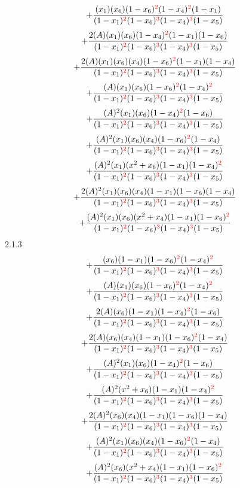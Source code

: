 \documentclass{article}
\begin{document}
\[+\frac{(x_1)(x_6)(1-x_6)^{\textcolor{red}{2}}(1-x_4)^{\textcolor{red}{2}}(1-x_1)}{(1-x_1)^{\textcolor{red}{2}}(1-x_6)^{\textcolor{red}{3}}(1-x_4)^{\textcolor{red}{3}}(1-x_5)}\]\[+\frac{2(A)(x_1)(x_6)(1-x_4)^{\textcolor{red}{2}}(1-x_1)(1-x_6)}{(1-x_1)^{\textcolor{red}{2}}(1-x_6)^{\textcolor{red}{3}}(1-x_4)^{\textcolor{red}{3}}(1-x_5)}\]\[+\frac{2(A)(x_1)(x_6)(x_4)(1-x_6)^{\textcolor{red}{2}}(1-x_1)(1-x_4)}{(1-x_1)^{\textcolor{red}{2}}(1-x_6)^{\textcolor{red}{3}}(1-x_4)^{\textcolor{red}{3}}(1-x_5)}\]\[+\frac{(A)(x_1)(x_6)(1-x_6)^{\textcolor{red}{2}}(1-x_4)^{\textcolor{red}{2}}}{(1-x_1)^{\textcolor{red}{2}}(1-x_6)^{\textcolor{red}{3}}(1-x_4)^{\textcolor{red}{3}}(1-x_5)}\]\[+\frac{(A)^{2}(x_1)(x_6)(1-x_4)^{\textcolor{red}{2}}(1-x_6)}{(1-x_1)^{\textcolor{red}{2}}(1-x_6)^{\textcolor{red}{3}}(1-x_4)^{\textcolor{red}{3}}(1-x_5)}\]\[+\frac{(A)^{2}(x_1)(x_6)(x_4)(1-x_6)^{\textcolor{red}{2}}(1-x_4)}{(1-x_1)^{\textcolor{red}{2}}(1-x_6)^{\textcolor{red}{3}}(1-x_4)^{\textcolor{red}{3}}(1-x_5)}\]\[+\frac{(A)^{2}(x_1)(x^{2}+x_6)(1-x_1)(1-x_4)^{\textcolor{red}{2}}}{(1-x_1)^{\textcolor{red}{2}}(1-x_6)^{\textcolor{red}{3}}(1-x_4)^{\textcolor{red}{3}}(1-x_5)}\]\[+\frac{2(A)^{2}(x_1)(x_6)(x_4)(1-x_1)(1-x_6)(1-x_4)}{(1-x_1)^{\textcolor{red}{2}}(1-x_6)^{\textcolor{red}{3}}(1-x_4)^{\textcolor{red}{3}}(1-x_5)}\]\[+\frac{(A)^{2}(x_1)(x_6)(x^{2}+x_4)(1-x_1)(1-x_6)^{\textcolor{red}{2}}}{(1-x_1)^{\textcolor{red}{2}}(1-x_6)^{\textcolor{red}{3}}(1-x_4)^{\textcolor{red}{3}}(1-x_5)}\]
2.1.3
\[+\frac{(x_6)(1-x_1)(1-x_6)^{\textcolor{red}{2}}(1-x_4)^{\textcolor{red}{2}}}{(1-x_1)^{\textcolor{red}{2}}(1-x_6)^{\textcolor{red}{3}}(1-x_4)^{\textcolor{red}{3}}(1-x_5)}\]\[+\frac{(A)(x_1)(x_6)(1-x_6)^{\textcolor{red}{2}}(1-x_4)^{\textcolor{red}{2}}}{(1-x_1)^{\textcolor{red}{2}}(1-x_6)^{\textcolor{red}{3}}(1-x_4)^{\textcolor{red}{3}}(1-x_5)}\]\[+\frac{2(A)(x_6)(1-x_1)(1-x_4)^{\textcolor{red}{2}}(1-x_6)}{(1-x_1)^{\textcolor{red}{2}}(1-x_6)^{\textcolor{red}{3}}(1-x_4)^{\textcolor{red}{3}}(1-x_5)}\]\[+\frac{2(A)(x_6)(x_4)(1-x_1)(1-x_6)^{\textcolor{red}{2}}(1-x_4)}{(1-x_1)^{\textcolor{red}{2}}(1-x_6)^{\textcolor{red}{3}}(1-x_4)^{\textcolor{red}{3}}(1-x_5)}\]\[+\frac{(A)^{2}(x_1)(x_6)(1-x_4)^{\textcolor{red}{2}}(1-x_6)}{(1-x_1)^{\textcolor{red}{2}}(1-x_6)^{\textcolor{red}{3}}(1-x_4)^{\textcolor{red}{3}}(1-x_5)}\]\[+\frac{(A)^{2}(x^{2}+x_6)(1-x_1)(1-x_4)^{\textcolor{red}{2}}}{(1-x_1)^{\textcolor{red}{2}}(1-x_6)^{\textcolor{red}{3}}(1-x_4)^{\textcolor{red}{3}}(1-x_5)}\]\[+\frac{2(A)^{2}(x_6)(x_4)(1-x_1)(1-x_6)(1-x_4)}{(1-x_1)^{\textcolor{red}{2}}(1-x_6)^{\textcolor{red}{3}}(1-x_4)^{\textcolor{red}{3}}(1-x_5)}\]\[+\frac{(A)^{2}(x_1)(x_6)(x_4)(1-x_6)^{\textcolor{red}{2}}(1-x_4)}{(1-x_1)^{\textcolor{red}{2}}(1-x_6)^{\textcolor{red}{3}}(1-x_4)^{\textcolor{red}{3}}(1-x_5)}\]\[+\frac{(A)^{2}(x_6)(x^{2}+x_4)(1-x_1)(1-x_6)^{\textcolor{red}{2}}}{(1-x_1)^{\textcolor{red}{2}}(1-x_6)^{\textcolor{red}{3}}(1-x_4)^{\textcolor{red}{3}}(1-x_5)}\]
\end{document}

